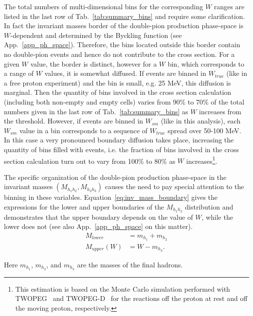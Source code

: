 The total numbers of multi-dimensional bins for the corresponding $W$ ranges are listed in the last row of Tab.~\ref{tab:summary_bins} and require some clarification. In fact the invariant masses border of the double-pion production phase-space is $W$-dependent and determined by the Byckling function (see App.~\ref{app_ph_space}). Therefore, the bins located outside this border contain no double-pion events and hence do not contribute to the cross section. For a given $W$ value, the border is distinct, however for a $W$ bin, which corresponds to a range of $W$ values, it is somewhat diffused. If events are binned in $W_{true}$ (like in a free proton experiment) and the bin is small, e.g. 25 MeV, this diffusion is marginal. Then the quantity of bins involved in the cross section calculation (including both non-empty and empty cells) varies from 90\% to 70\% of the total numbers given in the last row of Tab.~\ref{tab:summary_bins} as $W$ increases from the threshold. However, if events are binned in $W_{sm}$ (like in this analysis), each $W_{sm}$ value in a bin corresponds to a sequence of $W_{true}$ spread over 50-100 MeV. In this case a very pronounced boundary diffusion takes place, increasing the quantity of bins filled with events, i.e. the fraction of bins involved in the cross section calculation turn out to vary from 100\% to 80\% as $W$ increases\footnote[8]{This estimation is based on the Monte Carlo simulation performed with TWOPEG~\cite{twopeg} and TWOPEG-D~\cite{twopeg-d} for the reactions off the proton at rest and off the moving proton, respectively.}.



The specific organization of the double-pion production phase-space in the invariant masses $(M_{h_{1}h_{2}}, M_{h_{2}h_{3}})$ causes the need to pay special attention to the binning in these variables. Equation~\eqref{eq:inv_mass_boundary} gives the expressions for the lower and upper boundaries of the $M_{h_{1}h_{2}}$ distribution and demonstrates that the upper boundary depends on the value of $W$, while the lower does not (see also App.~\ref{app_ph_space} on this matter).
\begin{equation}
\begin{aligned}
M_{lower} &= m_{h_1} + m_{h_2} \\
M_{upper} (W) &= W - m_{h_3}. \label{eq:inv_mass_boundary}
\end{aligned}  
\end{equation}

Here $m_{h_1}$, $m_{h_2}$, and $m_{h_3}$ are the masses of the final hadrons. 


